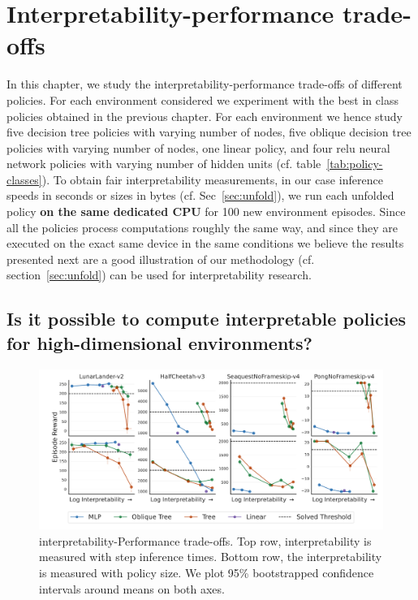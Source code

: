 \chapter{Interpretability-performance trade-offs}\label{sec:exps2}
In this chapter, we study the interpretability-performance trade-offs of different policies.
For each environment considered we experiment with the best in class policies obtained in the previous chapter.  
For each environment we hence study five decision tree policies with varying number of nodes, five oblique decision tree policies with varying number of nodes, one linear policy, and four relu neural network policies with varying number of hidden units (cf. table~\ref{tab:policy-classes}).
To obtain fair interpretability measurements, in our case inference speeds in seconds or sizes in bytes (cf. Sec~\ref{sec:unfold}), we run each unfolded policy \textbf{on the same dedicated CPU} for 100 new environment episodes.
Since all the policies process computations roughly the same way, and since they are executed on the exact same device in the same conditions we believe the results presented next are a good illustration of our methodology (cf. section~\ref{sec:unfold}) 
can be used for interpretability research.
\section{Is it possible to compute interpretable policies for high-dimensional environments?}

\begin{figure}
    \centering
    \includegraphics[trim={1.4cm 0 0 0},clip,width=1\textwidth]{images/images_part3/trade_off_select_combine_one_plot.pdf}
    \caption{interpretability-Performance trade-offs. Top row, interpretability is measured with step inference times. Bottom row, the interpretability is measured with policy size. We plot 95\% bootstrapped confidence intervals around means on both axes.}
    \label{fig:trade-off-summary}
\end{figure}

